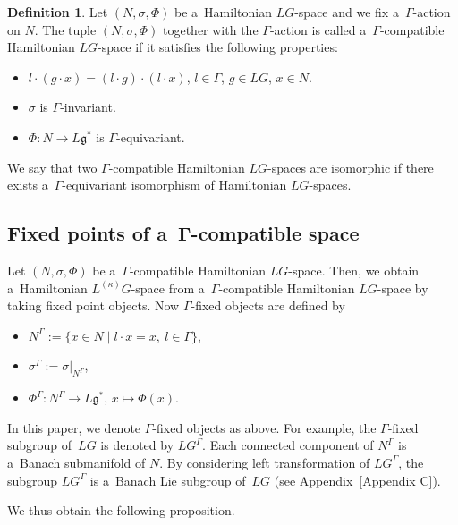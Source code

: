 \documentclass[pdftex]{sigma}
\numberwithin{equation}{section}
\theoremstyle{definition}
\newtheorem{Definition}[Theorem]{Definition}
\begin{document}
\begin{Definition}
Let $(N,\sigma,\Phi)$ be a~Hamiltonian $LG$-space and we fix a~$\Gamma$-action on $N$.
 The tuple $(N,\sigma,\Phi)$ together with the $\Gamma$-action is called a~$\Gamma$-compatible Hamiltonian $LG$-space if it satisfies the following properties:
\begin{itemize}\itemsep=0pt
 \item[(1)] $l \cdot (g \cdot x) = (l \cdot g) \cdot (l \cdot x) $, $l \in \Gamma$, $ g \in LG$, $ x \in N$.
 \item[(2)] $\sigma$ is $\Gamma$-invariant.
 \item[(3)] $\Phi \colon N \to L\mathfrak{g}^*$ is $\Gamma$-equivariant.
 \end{itemize}

 We say that two $\Gamma$-compatible Hamiltonian $LG$-spaces are isomorphic
 if there exists a~$\Gamma$\nobreakdash-equi\-variant isomorphism of Hamiltonian $LG$-spaces.
\end{Definition}

\subsection[Fixed points of a Gamma-compatible space]{Fixed points of a~$\boldsymbol{\Gamma}$-compatible space}

Let $(N,\sigma,\Phi)$ be a~$\Gamma$-compatible Hamiltonian $LG$-space.
Then, we obtain a~Hamiltonian $L^{(\kappa)}G$-space from a~$\Gamma$-compatible Hamiltonian $LG$-space by taking fixed point objects.
Now $\Gamma$-fixed objects are defined by
\begin{itemize}\itemsep=0pt
 \item $N^{\Gamma} := \{x \in N \mid l \cdot x = x,\ l \in \Gamma\}$,
 \item $\sigma^{\Gamma} := \sigma|_{N^{\Gamma}}$,
 \item $\Phi ^{\Gamma} \colon N^{\Gamma} \to L\mathfrak{g}^{*}$, $x \mapsto \Phi(x)$.
\end{itemize}
In this paper, we denote $\Gamma$-fixed objects as above. For example, the $\Gamma$-fixed subgroup of~$LG$ is denoted by $LG^{\Gamma}$.
Each connected component of $N^{\Gamma}$ is a~Banach submanifold of $N$.
By considering left transformation of $LG^{\Gamma}$,
the subgroup $LG^{\Gamma}$ is a~Banach Lie subgroup of~$LG$ (see Appendix~\ref{Appendix C}).

We thus obtain the following proposition.
\end{document}
